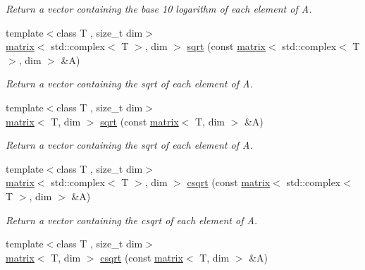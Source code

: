 \begin{DoxyCompactItemize}
\begin{DoxyCompactList}\small\item\em Return a vector containing the base 10 logarithm of each element of A. \end{DoxyCompactList}\item 
\hypertarget{namespacekeycpp_a28a50cdc90b4c6f56bf9a7c144c4ac95}{{\footnotesize template$<$class T , size\-\_\-t dim$>$ }\\\hyperlink{classkeycpp_1_1matrix}{matrix}$<$ std\-::complex$<$ T $>$, dim $>$ \hyperlink{namespacekeycpp_a28a50cdc90b4c6f56bf9a7c144c4ac95}{sqrt} (const \hyperlink{classkeycpp_1_1matrix}{matrix}$<$ std\-::complex$<$ T $>$, dim $>$ \&A)}\label{namespacekeycpp_a28a50cdc90b4c6f56bf9a7c144c4ac95}

\begin{DoxyCompactList}\small\item\em Return a vector containing the sqrt of each element of A. \end{DoxyCompactList}\item 
\hypertarget{namespacekeycpp_a1c9bd9044cff082d4bb16bf36903ca2f}{{\footnotesize template$<$class T , size\-\_\-t dim$>$ }\\\hyperlink{classkeycpp_1_1matrix}{matrix}$<$ T, dim $>$ \hyperlink{namespacekeycpp_a1c9bd9044cff082d4bb16bf36903ca2f}{sqrt} (const \hyperlink{classkeycpp_1_1matrix}{matrix}$<$ T, dim $>$ \&A)}\label{namespacekeycpp_a1c9bd9044cff082d4bb16bf36903ca2f}

\begin{DoxyCompactList}\small\item\em Return a vector containing the sqrt of each element of A. \end{DoxyCompactList}\item 
\hypertarget{namespacekeycpp_ae86dd983e0f6ac12811b765d7cb68f68}{{\footnotesize template$<$class T , size\-\_\-t dim$>$ }\\\hyperlink{classkeycpp_1_1matrix}{matrix}$<$ std\-::complex$<$ T $>$, dim $>$ \hyperlink{namespacekeycpp_ae86dd983e0f6ac12811b765d7cb68f68}{csqrt} (const \hyperlink{classkeycpp_1_1matrix}{matrix}$<$ std\-::complex$<$ T $>$, dim $>$ \&A)}\label{namespacekeycpp_ae86dd983e0f6ac12811b765d7cb68f68}

\begin{DoxyCompactList}\small\item\em Return a vector containing the csqrt of each element of A. \end{DoxyCompactList}\item 
\hypertarget{namespacekeycpp_a7ac11afedab6d33ab5c6bf7e7f7c7a32}{{\footnotesize template$<$class T , size\-\_\-t dim$>$ }\\\hyperlink{classkeycpp_1_1matrix}{matrix}$<$ T, dim $>$ \hyperlink{namespacekeycpp_a7ac11afedab6d33ab5c6bf7e7f7c7a32}{csqrt} (const \hyperlink{classkeycpp_1_1matrix}{matrix}$<$ T, dim $>$ \&A)}\label{namespacekeycpp_a7ac11afedab6d33ab5c6bf7e7f7c7a32}


\end{DoxyCompactItemize}
